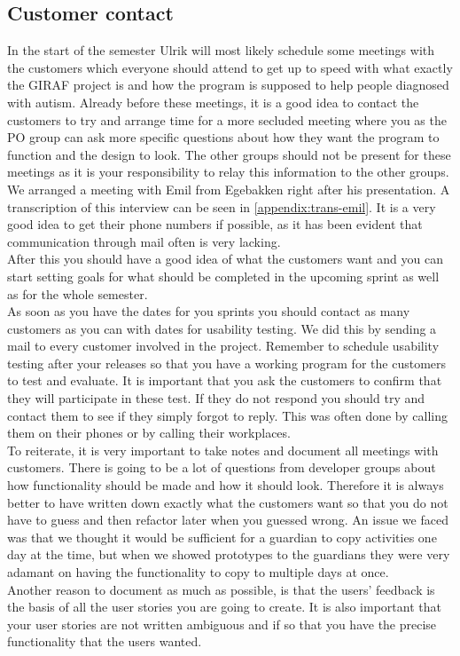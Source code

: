 \subsection{Customer contact}
In the start of the semester Ulrik will most likely schedule some meetings with the customers which everyone should attend to get up to speed with what exactly the GIRAF project is and how the program is supposed to help people diagnosed with autism.
Already before these meetings, it is a good idea to contact the customers to try and arrange time for a more secluded meeting where you as the PO group can ask more specific questions about how they want the program to function and the design to look.
The other groups should not be present for these meetings as it is your responsibility to relay this information to the other groups.
We arranged a meeting with Emil from Egebakken right after his presentation. 
A transcription of this interview can be seen in \autoref{appendix:trans-emil}.
It is a very good idea to get their phone numbers if possible, as it has been evident that communication through mail often is very lacking.
\\
After this you should have a good idea of what the customers want and you can start setting goals for what should be completed in the upcoming sprint as well as for the whole semester.
\\
As soon as you have the dates for you sprints you should contact as many customers as you can with dates for usability testing. We did this by sending a mail to every customer involved in the project.
Remember to schedule usability testing after your releases so that you have a working program for the customers to test and evaluate.
It is important that you ask the customers to confirm that they will participate in these test.
If they do not respond you should try and contact them to see if they simply forgot to reply. This was often done by calling them on their phones or by calling their workplaces.
\\
To reiterate, it is very important to take notes and document all meetings with customers.
There is going to be a lot of questions from developer groups about how functionality should be made and how it should look.
Therefore it is always better to have written down exactly what the customers want so that you do not have to guess and then refactor later when you guessed wrong.
An issue we faced was that we thought it would be sufficient for a guardian to copy activities one day at the time, but when we showed prototypes to the guardians they were very adamant on having the functionality to copy to multiple days at once.
\\
Another reason to document as much as possible, is that the users' feedback is the basis of all the user stories you are going to create.
It is also important that your user stories are not written ambiguous and if so that you have the precise functionality that the users wanted.

